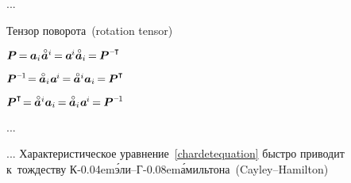 \begin{otherlanguage}{russian}
...

Тензор поворота~(rotation tensor)

$\bm{P} \hspace{-0.2ex} = \hspace{-0.1ex} \bm{a}_i \hspace{.1ex} \mathcircabove{\bm{a}}^i \hspace{-0.2ex} = \hspace{-0.1ex} \bm{a}^{\hspace{-0.16ex}i} \mathcircabove{\bm{a}}_i \hspace{-0.2ex} = \hspace{-0.1ex} \bm{P}^{\expminusT}$

$\bm{P}^{\expminusone} \hspace{-0.4ex} = \hspace{-0.1ex} \mathcircabove{\bm{a}}_i \hspace{.1ex} \bm{a}^{\hspace{-0.16ex}i} \hspace{-0.2ex} = \hspace{-0.1ex} \mathcircabove{\bm{a}}^i \bm{a}_i \hspace{-0.2ex} = \hspace{-0.1ex} \bm{P}^{\T}$

$\bm{P}^{\T} \hspace{-0.4ex} = \hspace{-0.1ex} \mathcircabove{\bm{a}}^i \bm{a}_i \hspace{-0.2ex} = \hspace{-0.1ex} \mathcircabove{\bm{a}}_i \hspace{.1ex} \bm{a}^{\hspace{-0.16ex}i} \hspace{-0.2ex} = \hspace{-0.1ex} \bm{P}^{\expminusone}$

...



... Характеристическое уравнение~\eqref{chardetequation} быстро приводит к~тождеству К\kern-0.04em\'{э}ли\hbox{--}Г\kern-0.08em\'{а}мильтона~(Cayley\hbox{--}Hamilton)


\end{otherlanguage}
